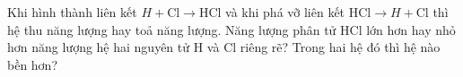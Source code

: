 \begin{bt}
	Khi hình thành liên kết $H+\mathrm{Cl} \rightarrow \mathrm{HCl}$ và khi phá vỡ liên kết $\mathrm{HCl} \rightarrow H+\mathrm{Cl}$ thì hệ thu năng lượng hay toả năng lượng. Năng lượng phân tử HCl lớn hơn hay nhỏ hơn năng lượng hệ hai nguyên tử H và Cl riêng rẽ? Trong hai hệ đó thì hệ nào bền hơn?
	\loigiai{}
\end{bt}
